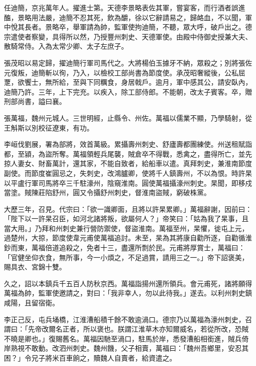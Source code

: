 \begin{pinyinscope}
 任迪簡，京兆萬年人。擢進士第。天德李景略表佐其軍，嘗宴客，而行酒者誤進醢，景略用法嚴，迪簡不忍其死，飲為釂，徐以它辭請易之，歸衉血，不以聞，軍中悅其長者。景略卒，舉軍請為帥，監軍使拘迪簡，不聽，眾大呼，破戶出之。德宗遣使者察變，具得所以然，乃授豐州刺史、天德軍使。由殿中侍御史授兼大夫、散騎常侍。入為太常少卿、太子左庶子。



 張茂昭以易定歸，擢迪簡行軍司馬代之。大將楊伯玉據牙不納，眾殺之；別將張佐元復叛，迪簡斬以徇，乃入，以檢校工部尚書為節度使。承茂昭奢縱後，公私屈覂，欲饗士，無所給，至與下同糲食，身居戟戶。逾月，軍中感其公，請安臥內，迪簡乃許。三年，上下完充。以疾入，除工部侍郎。不能朝，改太子賓客。卒，贈刑部尚書，謚曰襄。



 張萬福，魏州元城人。三世明經，止縣令、州佐。萬福以儒業不顯，乃學騎射，從王斛斯以別校征遼東，有功。



 李峘伐劉展，署為部將，效首萬級。累攝壽州刺史、舒廬壽都團練使。州送租賦詣都，至潁，為盜所奪。萬福領輕兵尾襲，賊倉卒不得戰，悉禽之，盡得所亡，並先掠人妻女、財畜萬計，還其家，不能自致者，給船車以遣。真拜刺史，兼淮南節度副使。而節度崔圓忌之，失刺史，改鴻臚卿，使將千人鎮壽州，不以為恨。時許杲以平盧行軍司馬將卒三千駐濠州，陰窺淮南。圓使萬福攝濠州刺史。杲聞，即移戍當塗。賊陳莊陷舒州，圓又令攝舒州刺史，督淮南盜賊，窮破株黨。



 大歷三年，召見。代宗曰：「欲一識卿面，且將以許杲累卿。」萬福辭謝，因前曰：「陛下以一許杲召臣，如河北諸將叛，欲屬何人？」帝笑曰：「姑為我了杲事，且當大用。」乃拜和州刺史兼行營防禦使，督盜淮南。萬福至州，杲懼，徙屯上元，過楚州，大掠，節度使韋元甫使萬福追討。未至，杲為其將康自勸所逐，自勸循淮鈔而東，萬福倍道追殺之，免者十三，盡還所剽於民。元甫將厚賞士，萬福曰：「官健坐仰衣食，無所事，今一小煩之，不足過賞，請用三之一。」帝下詔褒美，賜具衣、宮錦十雙。



 久之，詔以本鎮兵千五百人防秋京西。萬福詣揚州還所領兵。會元甫死，諸將願得萬福為帥，監軍使邀請之，對曰：「我非幸人，勿以此待我。」遂去。以利州刺史鎮咸陽，且留宿衛。



 李正己反，屯兵埇橋，江淮漕船積千餘不敢逾渦口。德宗乃以萬福為濠州刺史，召謂曰：「先帝改爾名正者，所以褒也。朕謂江淮草木亦知爾威名，若從所改，恐賊不曉是卿也。」復賜舊名。萬福因馳至渦口，駐馬於岸，悉發漕船相銜進，賊兵倚岸熟視不敢動。改泗州刺史。魏州饑，父子相賣，萬福曰：「魏州吾鄉里，安忍其困？」令兄子將米百車餉之，贖魏人自賣者，給資遣之。




\end{pinyinscope}
